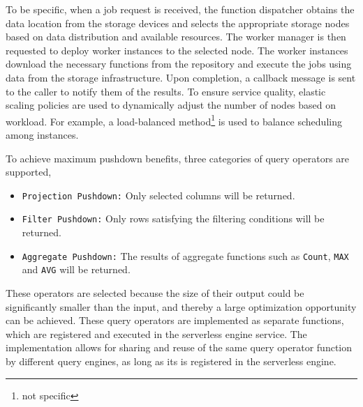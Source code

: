 To be specific, when a job request is received, the function dispatcher obtains the data location from the storage devices and selects the appropriate storage nodes based on data distribution and available resources. The worker manager is then requested to deploy worker instances to the selected node. The worker instances download the necessary functions from the repository and execute the jobs using data from the storage infrastructure. Upon completion, a callback message is sent to the caller to notify them of the results. To ensure service quality, elastic scaling policies are used to dynamically adjust the number of nodes based on workload. 
For example, a load-balanced method\footnote{not specific} is used to balance scheduling among instances.


To achieve maximum pushdown benefits, three categories of query operators are supported, 

\begin{itemize}

\item \texttt{Projection Pushdown:}  Only selected columns will be returned.

\item \texttt{Filter Pushdown:} Only rows satisfying the filtering conditions will be returned.

\item \texttt{Aggregate  Pushdown:} The results of aggregate functions such as \texttt{Count}, \texttt{MAX} and \texttt{AVG} will be returned.

\end{itemize}

These operators are selected because the size of their output could be significantly smaller than the input, and thereby a large optimization opportunity can be achieved.
These query operators are implemented as separate functions, which are registered and executed in the serverless engine service. The implementation allows for sharing and reuse of the same query operator function by different query engines, as long as its  is registered in the serverless engine.


